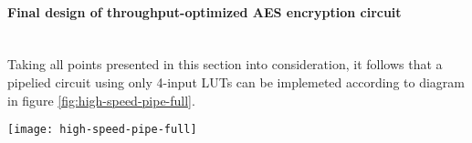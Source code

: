 \paragraph{Final design of throughput-optimized AES encryption circuit}\mbox{}\\
Taking all points presented in this section into consideration, it follows that a pipelied circuit using only 4-input LUTs can be implemeted according to diagram in figure \ref{fig:high-speed-pipe-full}.


\begin{sidewaysfigure}[!h]
\centering
\texttt{[image: high-speed-pipe-full]}
\caption{Throughput optimized AES encryption pipelined circuit}
\label{fig:high-speed-pipe-full}
\end{sidewaysfigure}

\newpage